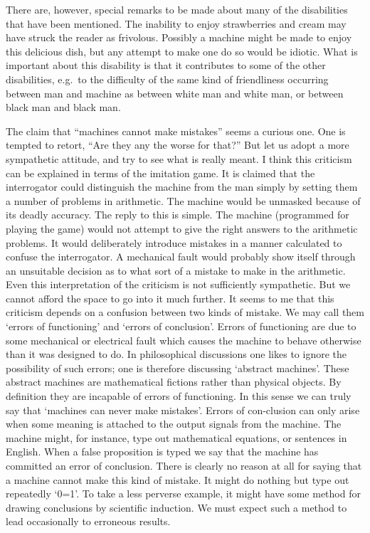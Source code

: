 \documentclass[10pt]{article} %
\begin{document}
There are, however, special remarks to be made about many of the disabilities that have been mentioned. The inability to enjoy strawberries and cream may have struck the reader as frivolous. Possibly a machine might be made to enjoy this delicious dish, but any attempt to make one do so would be idiotic. What is important about this disability is that it contributes to some of the other disabilities, e.g.~to the difficulty of the same kind of friendliness occurring between man and machine as between white man and white man, or between black man and black man.

The claim that ``machines cannot make mistakes'' seems a curious one. One is tempted to retort, ``Are they any the worse for that?'' But let us adopt a more sympathetic attitude, and try to see what is really meant. I think this criticism can be explained in terms of the imitation game. It is claimed that the interrogator could distinguish the machine from the man simply by setting them a number of problems in arithmetic. The machine would be unmasked because of its deadly accuracy. The reply to this is simple. The machine (programmed for playing the game) would not attempt to give the right answers to the arithmetic problems. It would deliberately introduce mistakes in a manner calculated to confuse the interrogator. A mechanical fault would probably show itself through an unsuitable decision as to what sort of a mistake to make in the arithmetic. Even this interpretation of the criticism is not sufficiently sympathetic. But we cannot afford the space to go into it much further. It seems to me that this criticism depends on a confusion between two kinds of mistake. We may call them `errors of functioning' and `errors of conclusion'. Errors of functioning are due to some mechanical or electrical fault which causes the machine to behave otherwise than it was designed to do. In philosophical discussions one likes to ignore the possibility of such errors; one is therefore discussing `abstract machines'. These abstract machines are mathematical fictions rather than physical objects. By definition they are incapable of errors of functioning. In this sense we can truly say that `machines can never make mistakes'. Errors of con-clusion can only arise when some meaning is attached to the output signals from the machine. The machine might, for instance, type out mathematical equations, or sentences in English. When a false proposition is typed we say that the machine has committed an error of conclusion. There is clearly no reason at all for saying that a machine cannot make this kind of mistake. It might do nothing but type out repeatedly `0=1'. To take a less perverse example, it might have some method for drawing conclusions by scientific induction. We must expect such a method to lead occasionally to erroneous results.
\end{document}
